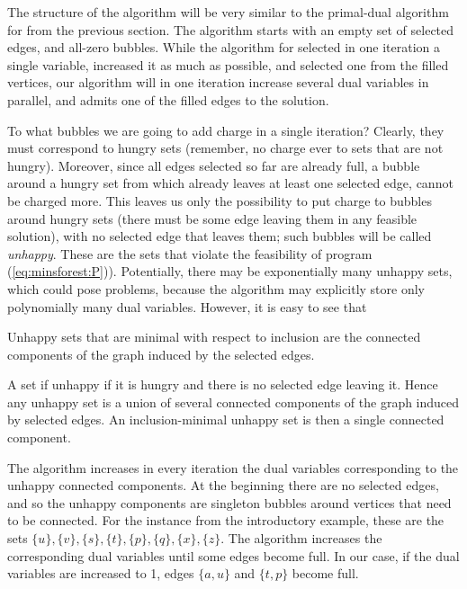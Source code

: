 \noindent 
The structure of the algorithm will be very similar to the primal-dual algorithm for \minvcover
from the previous section. The algorithm starts with an empty set of selected edges, and all-zero
bubbles. While the algorithm for \minvcover selected in one iteration a single variable, increased it
as much as possible, and selected one from the filled vertices, our algorithm will in one iteration
increase several dual variables in parallel, and admits one of the filled edges to the solution.


\noindent
To what bubbles we are going to add charge in a single iteration? Clearly, they must correspond to hungry sets
(remember, no charge ever to sets that are not hungry). Moreover, since all edges selected so far are 
already full, a bubble
around a hungry set from which already leaves at least one selected edge, cannot be charged more. 
This leaves us only the possibility to put charge to bubbles around hungry sets (there must be some
edge leaving them in any feasible solution), with  no selected edge that leaves them; such bubbles
will be called {\em unhappy}. These are the sets that violate the feasibility of program  (\ref{eq:minsforest:P})).
Potentially, there may be exponentially many unhappy sets, which could pose problems, because the algorithm
may explicitly store only polynomially many dual variables. However, it is easy to see that


\begin{lema}
  Unhappy sets that are minimal with respect to inclusion are the connected components of the graph 
  induced by the selected edges.
\end{lema}

\begin{dokaz}
  A set if unhappy if it is hungry and there is no selected edge leaving it. Hence any unhappy set
  is a union of several connected components of the graph induced by selected edges. An inclusion-minimal
  unhappy set is then a single connected component.
\end{dokaz}

\noindent
The algorithm increases in every iteration the dual variables corresponding to the unhappy connected
components. At the beginning there are no selected edges, and so the unhappy components are singleton 
bubbles around vertices that need to be connected. For the instance from the introductory example, these
are the sets  $\{u\},\{v\},\{s\},\{t\},\{p\},\{q\},\{x\},\{z\}$.
The algorithm increases the corresponding dual variables until some edges become full. In our case,
if the dual variables are increased to 1, edges $\{a,u\}$ and $\{t,p\}$ become full.

